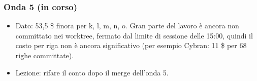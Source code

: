 \documentclass[11pt]{article}
\begin{document}
\subsubsection{Onda 5 (in corso)}
\label{sec:org879ea6f}
\begin{itemize}
\item Dato: 53,5 \$ finora per k, l, m, n, o. Gran parte del lavoro è ancora non committato nei worktree, fermato dal
limite di sessione delle 15:00, quindi il costo per riga non è ancora significativo (per esempio Cybran: 11 \$ per
68 righe committate).
\item Lezione: rifare il conto dopo il merge dell'onda 5.
\end{itemize}
\end{document}
